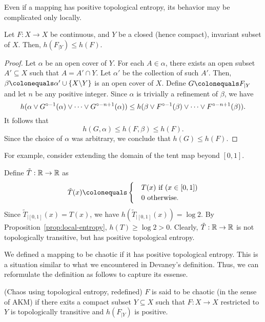 \documentclass[12pt,twoside,draft]{book}
\begin{document}
Even if a mapping has positive topological entropy, its behavior may be complicated only locally.
\begin{proposition}
  Let $F: X \to X$ be continuous, and $Y$ be a closed (hence compact), invariant subset of $X$.
  Then, $h(F_{|Y}) \leq h(F)$.
  \label{prop:local-entropy}
  \begin{proof}
    Let $\alpha$ be an open cover of $Y$.
    For each $A \in \alpha$, there exists an open subset $A' \subseteq X$ such that $A = A' \cap Y$.
    Let $\alpha'$ be the collection of such $A'$.
    Then, $\beta \ceq \alpha' \cup \set{X\bs Y}$ is an open cover of $X$.
    Define $G \ceq F_{|Y}$ and let $n$ be any positive integer.
    Since $\alpha$ is trivially a refinement of $\beta$, we have
    \begin{equation*}
      h(\alpha \vee G^{\circ -1}(\alpha) \vee \cdots \vee G^{\circ -n+1}(\alpha)) 
      \leq
      h(\beta \vee F^{\circ -1}(\beta) \vee \cdots \vee F^{\circ -n+1}(\beta)).
    \end{equation*}
    It follows that
    \begin{equation*}
      h(G, \alpha) \leq h(F, \beta) \leq h(F).
    \end{equation*}
    Since the choice of $\alpha$ was arbitrary, we conclude that $h(G) \leq h(F)$.
  \end{proof}
\end{proposition}
For example, consider extending the domain of the tent map beyond $[0,1]$.
\begin{example}
  Define $\tilde{T}: \mathbb{R} \to \mathbb{R}$ as
  \begin{equation*}
    \tilde{T}(x) 
    \ceq \begin{cases}
      &T(x) \mbox{ if } (x \in [0,1]) \\
      &0 \mbox{ otherwise}.
      \end{cases}
  \end{equation*}
  Since $\tilde{T}_{|[0,1]}(x) = T(x)$, we have $h(\tilde{T}_{|[0,1]}(x)) = \log 2$. 
  By Proposition~\ref{prop:local-entropy}, $h(T) \geq \log 2 > 0$.
  Clearly, $\tilde{T}: \mathbb{R} \to \mathbb{R}$ is not topologically transitive, but has positive topological entropy.
\end{example}
We defined a mapping to be chaotic if it has positive topological entropy.
This is a situation similar to what we encountered in Devaney's definition.
Thus, we can reformulate the definition as follows to capture its essense.
\begin{definition}
  (Chaos using topological entropy, redefined)
  $F$ is said to be chaotic (in the sense of AKM) if there exits a compact subset $Y \subseteq X$ such that $F: X \to X$ restricted to $Y$ is topologically transitive and $h(F_{|Y})$ is positive.
\end{definition}
\end{document}
